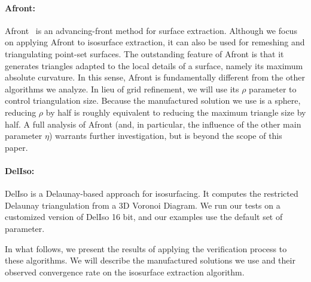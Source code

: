 \paragraph*{Afront:} Afront~\cite{Schreiner06} is an advancing-front method
for surface extraction. Although we focus on applying Afront to
isosurface extraction, it can also be used for remeshing and
triangulating point-set surfaces. The outstanding feature of Afront is
that it generates triangles adapted to the local details of a surface,
namely its maximum absolute curvature. In this sense, Afront is
fundamentally different from the other algorithms we analyze. In lieu
of grid refinement, we will use its $\rho$ parameter to control
triangulation size. Because the manufactured solution we use is a
sphere, reducing $\rho$ by half is roughly equivalent to reducing the
maximum triangle size by half. A full analysis of Afront (and, in
particular, the influence of the other main parameter $\eta$) warrants
further investigation, but is beyond the scope of this paper.

\paragraph*{DelIso:} DelIso \cite{Dey07} is a Delaunay-based 
approach for isosurfacing. It computes the restricted Delaunay triangulation 
from a 3D Voronoi Diagram. We run our tests on a customized version of DelIso 16 bit, 
and our examples use the default set of parameter.


In what follows, we present the results of applying the verification process 
to these algorithms. We will describe the manufactured solutions we use and
their observed convergence rate on the isosurface extraction algorithm.


